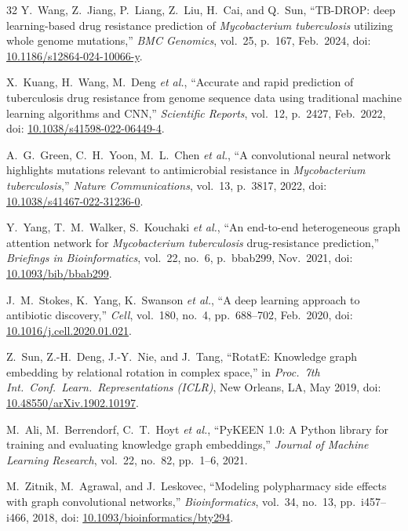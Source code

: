 \documentclass[conference]{IEEEtran}
\begin{document}
\begin{thebibliography}{32}
Y.~Wang, Z.~Jiang, P.~Liang, Z.~Liu, H.~Cai, and Q.~Sun,
``TB-DROP: deep learning-based drug resistance prediction of
\textit{Mycobacterium tuberculosis} utilizing whole genome mutations,''
\textit{BMC Genomics}, vol.~25, p.~167, Feb.\ 2024,
doi: \href{https://doi.org/10.1186/s12864-024-10066-y}{10.1186/s12864-024-10066-y}.

X.~Kuang, H.~Wang, M.~Deng \textit{et al.},
``Accurate and rapid prediction of tuberculosis drug resistance from
genome sequence data using traditional machine learning algorithms and CNN,''
\textit{Scientific Reports}, vol.~12, p.~2427, Feb.\ 2022,
doi: \href{https://doi.org/10.1038/s41598-022-06449-4}{10.1038/s41598-022-06449-4}.

A.~G.~Green, C.~H.~Yoon, M.~L.~Chen \textit{et al.},
``A convolutional neural network highlights mutations relevant to
antimicrobial resistance in \textit{Mycobacterium tuberculosis},''
\textit{Nature Communications}, vol.~13, p.~3817, 2022,
doi: \href{https://doi.org/10.1038/s41467-022-31236-0}{10.1038/s41467-022-31236-0}.

Y.~Yang, T.~M.~Walker, S.~Kouchaki \textit{et al.},
``An end-to-end heterogeneous graph attention network for
\textit{Mycobacterium tuberculosis} drug-resistance prediction,''
\textit{Briefings in Bioinformatics}, vol.~22, no.~6, p.~bbab299, Nov.\ 2021,
doi: \href{https://doi.org/10.1093/bib/bbab299}{10.1093/bib/bbab299}.

J.~M.~Stokes, K.~Yang, K.~Swanson \textit{et al.},
``A deep learning approach to antibiotic discovery,''
\textit{Cell}, vol.~180, no.~4, pp.~688--702, Feb.\ 2020,
doi: \href{https://doi.org/10.1016/j.cell.2020.01.021}{10.1016/j.cell.2020.01.021}.

Z.~Sun, Z.-H.~Deng, J.-Y.~Nie, and J.~Tang,
``RotatE: Knowledge graph embedding by relational rotation in complex space,''
in \textit{Proc.\ 7th Int.\ Conf.\ Learn.\ Representations (ICLR)},
New Orleans, LA, May 2019,
doi: \href{https://doi.org/10.48550/arXiv.1902.10197}{10.48550/arXiv.1902.10197}.

M.~Ali, M.~Berrendorf, C.~T.~Hoyt \textit{et al.},
``PyKEEN 1.0: A Python library for training and evaluating knowledge graph embeddings,''
\textit{Journal of Machine Learning Research}, vol.~22, no.~82, pp.~1--6, 2021.

M.~Zitnik, M.~Agrawal, and J.~Leskovec,
``Modeling polypharmacy side effects with graph convolutional networks,''
\textit{Bioinformatics}, vol.~34, no.~13, pp.~i457--i466, 2018,
doi: \href{https://doi.org/10.1093/bioinformatics/bty294}{10.1093/bioinformatics/bty294}.


\end{thebibliography}
\end{document}

